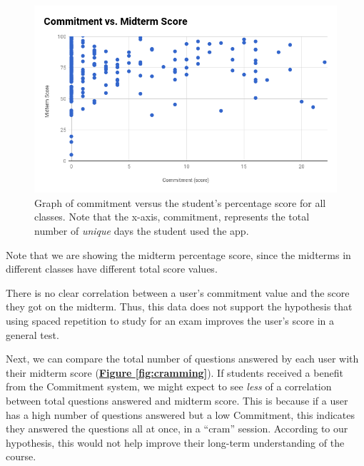  \begin{figure}[ht]
 	\includegraphics[width=1.0\linewidth]{figures/commitment-data1}
 	\caption{Graph of commitment versus the student's percentage score for all classes. Note that the x-axis, commitment, represents the total number of \textit{unique} days the student used the app.}
 	\label{fig:comm_vs_score}
 \end{figure}

\par Note that we are showing the midterm percentage score, since the midterms in different classes have different total score values.
\par There is no clear correlation between a user's commitment value and the score they got on the midterm. Thus, this data does not support the hypothesis that using spaced repetition to study for an exam improves the user's score in a general test.

\par  Next, we can compare the total number of questions answered by each user with their midterm score (\textbf{\hyperref[fig:cramming]{Figure \ref*{fig:cramming}}}). If students received a benefit from the Commitment system, we might expect to see \textit{less} of a correlation between total questions answered and midterm score. This is because if a user has a high number of questions answered but a low Commitment, this indicates they answered the questions all at once, in a ``cram'' session. According to our hypothesis, this would not help improve their long-term understanding of the course.

